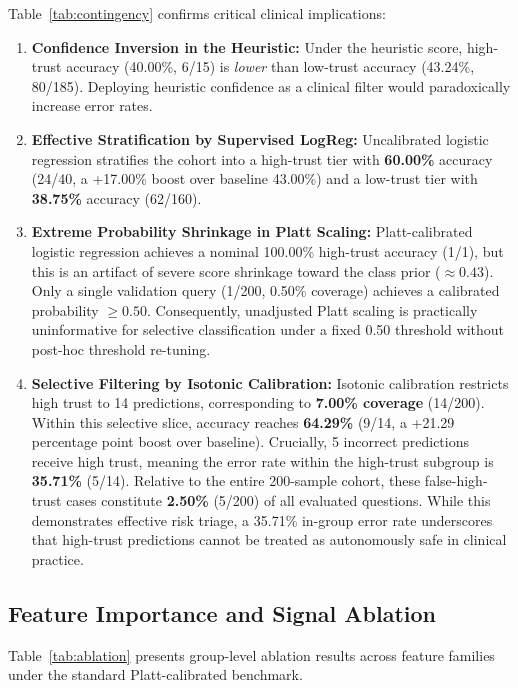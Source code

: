 \documentclass[journal,10pt]{IEEEtran}
\begin{document}
Table~\ref{tab:contingency} confirms critical clinical implications:
\begin{enumerate}
    \item \textbf{Confidence Inversion in the Heuristic:} Under the heuristic score, high-trust accuracy (40.00\%, 6/15) is \textit{lower} than low-trust accuracy (43.24\%, 80/185). Deploying heuristic confidence as a clinical filter would paradoxically increase error rates.
    \item \textbf{Effective Stratification by Supervised LogReg:} Uncalibrated logistic regression stratifies the cohort into a high-trust tier with \textbf{60.00\%} accuracy (24/40, a +17.00\% boost over baseline 43.00\%) and a low-trust tier with \textbf{38.75\%} accuracy (62/160).
    \item \textbf{Extreme Probability Shrinkage in Platt Scaling:} Platt-calibrated logistic regression achieves a nominal 100.00\% high-trust accuracy (1/1), but this is an artifact of severe score shrinkage toward the class prior ($\approx 0.43$). Only a single validation query (1/200, 0.50\% coverage) achieves a calibrated probability $\ge 0.50$. Consequently, unadjusted Platt scaling is practically uninformative for selective classification under a fixed 0.50 threshold without post-hoc threshold re-tuning.
    \item \textbf{Selective Filtering by Isotonic Calibration:} Isotonic calibration restricts high trust to 14 predictions, corresponding to \textbf{7.00\% coverage} (14/200). Within this selective slice, accuracy reaches \textbf{64.29\%} (9/14, a +21.29 percentage point boost over baseline). Crucially, 5 incorrect predictions receive high trust, meaning the error rate within the high-trust subgroup is \textbf{35.71\%} (5/14). Relative to the entire 200-sample cohort, these false-high-trust cases constitute \textbf{2.50\%} (5/200) of all evaluated questions. While this demonstrates effective risk triage, a 35.71\% in-group error rate underscores that high-trust predictions cannot be treated as autonomously safe in clinical practice.
\end{enumerate}

\subsection{Feature Importance and Signal Ablation}
Table~\ref{tab:ablation} presents group-level ablation results across feature families under the standard Platt-calibrated benchmark.
\end{document}
